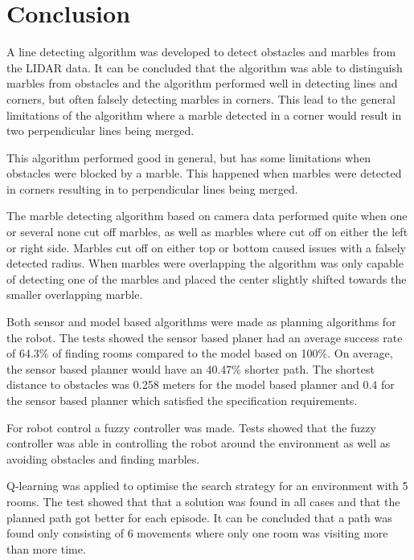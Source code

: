 \documentclass[../Head/Main.tex]{subfiles}
\begin{document}
\section{Conclusion}

A line detecting algorithm was developed to detect obstacles and marbles from the LIDAR data. It can be concluded that the algorithm was able to distinguish marbles from obstacles and the algorithm  performed well in detecting lines and corners, but often falsely detecting marbles in corners. This lead to the general limitations of the algorithm where a marble detected in a corner would result in two perpendicular lines being merged.


 This algorithm performed good in general, but has some limitations when obstacles were blocked by a marble. This happened when marbles were detected in corners resulting in to perpendicular lines being merged. 

The marble detecting algorithm based on camera data performed quite when one or several none cut off marbles, as well as marbles where cut off on either the left or right side. Marbles cut off on either top or bottom caused issues with a falsely detected radius. When marbles were overlapping the algorithm was only capable of detecting one of the marbles and placed the center slightly shifted towards the smaller overlapping marble. 

Both sensor and model based algorithms were made as planning algorithms for the robot. The tests showed the sensor based planer had an average success rate of 64.3\% of finding rooms compared to the model based on 100\%. On average, the sensor based planner would have an 40.47\% shorter path. The shortest distance to obstacles was 0.258 meters for the model based planner and 0.4 for the sensor based planner which satisfied the specification requirements. 

For robot control a fuzzy controller was made. Tests showed that the fuzzy controller was able in controlling the robot around the environment as well as avoiding obstacles and finding marbles.

Q-learning was applied to optimise the search strategy for an environment with 5 rooms. The test showed that that a solution was found in all cases and that the planned path got better for each episode. It can be concluded that a path was found only consisting of 6 movements where only one room was visiting more than more time.  
     
\end{document}
